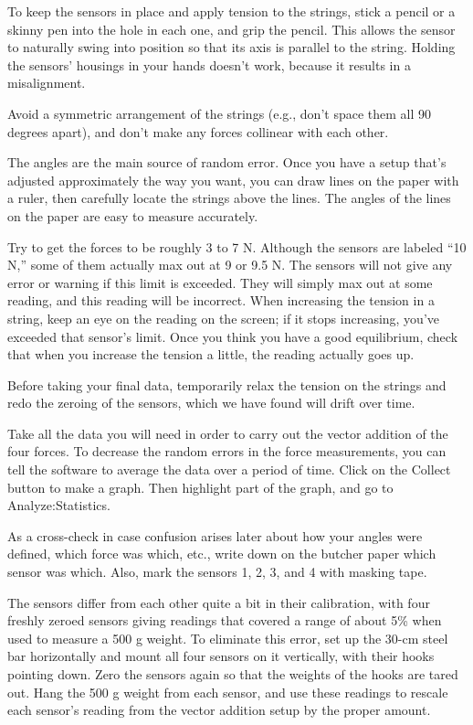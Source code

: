 To keep the sensors in place and apply tension to the strings, stick a pencil or a skinny
pen into the hole in each one, and grip the pencil. This allows the sensor to naturally swing
into position so that its axis is parallel to the string. Holding the sensors' housings in your
hands doesn't work, because it results in a misalignment.

Avoid a symmetric arrangement of
the strings (e.g., don't space them all 90 degrees apart), and
don't make any forces collinear with each other. 


The angles are the main source of random error. Once you have a setup that's adjusted
approximately the way you want, you can draw lines on the paper
with a ruler, then carefully locate the strings above the lines. The angles of the lines on
the paper are easy to measure accurately.

Try to get the forces to be roughly 3 to 7 N.
Although the sensors are labeled ``10 N,'' some of them actually max out at 9 or 9.5 N.
The sensors will not give any
error or warning if this limit is exceeded. They will simply max out at some
reading, and this reading will be incorrect. When increasing the tension in a string, keep an eye
on the reading on the screen; if it stops increasing, you've exceeded that sensor's limit.
Once you think you have a good equilibrium, check that when you increase the tension a little, the
reading actually goes up.

Before taking your final data, temporarily relax the tension on the strings and redo the zeroing of the
sensors, which we have found will drift over time.

Take all the data you will need in order to carry out the vector addition of the four forces.
To decrease the random errors in the force measurements, you can tell the software to average
the data over a period of time. Click on the Collect button to make a graph.
Then highlight part of the graph, and go to Analyze:Statistics.

As a cross-check in case confusion arises later about how your angles were defined, which
force was which, etc., write down on the butcher paper which sensor was which.
Also, 
mark the sensors 1, 2, 3, and 4 with masking tape.

The sensors differ from each other quite a bit in their
calibration, with four freshly zeroed sensors giving readings
that covered a range of about 5\% when used to measure a 500 g weight.
To eliminate this error, set up the 30-cm steel bar
horizontally and mount all four sensors on it vertically, with their hooks pointing down.
Zero the sensors again so that the weights of the hooks are tared out.
Hang the 500 g weight from each sensor, and use these readings to
rescale each sensor's reading from the vector addition setup by the proper amount.

